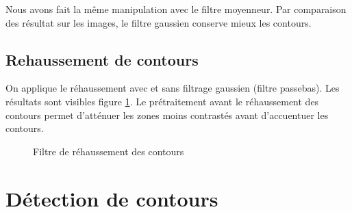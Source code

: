 \documentclass{article}
\begin{document}
Nous avons fait la même manipulation avec le filtre moyenneur. Par comparaison des résultat sur les images, le filtre gaussien conserve mieux les
contours.

\subsection{Rehaussement de contours}

On applique le réhaussement avec et sans filtrage gaussien (filtre passebas). Les résultats sont visibles figure
\ref{rehauss:init}.
Le prétraitement avant le réhaussement des contours permet d'atténuer les zones moins contrastés avant d'accuentuer les
contours.
\begin{figure}[!ht]%
  \centering
  \hspace{0.030\textwidth}
  \caption{Filtre de réhaussement des contours}
  \label{rehauss:init}
\end{figure}

\section{Détection de contours}
\end{document}

